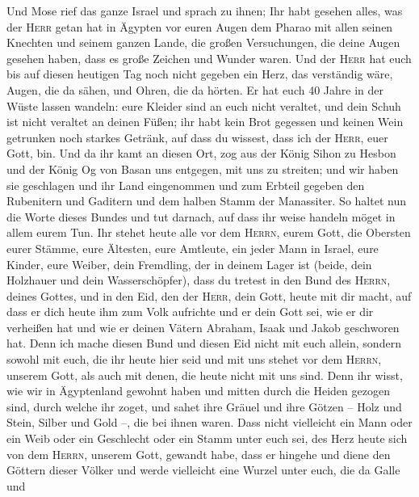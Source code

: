  Und Mose rief das ganze Israel und sprach zu ihnen; Ihr
habt gesehen alles, was der \textsc{Herr} getan hat in Ägypten vor euren
Augen dem Pharao mit allen seinen Knechten und seinem ganzen Lande,
 die großen Versuchungen, die deine Augen gesehen haben,
dass es große Zeichen und Wunder waren.  Und der
\textsc{Herr} hat euch bis auf diesen heutigen Tag noch nicht gegeben
ein Herz, das verständig wäre, Augen, die da sähen, und Ohren, die da
hörten.  Er hat euch 40 Jahre in der Wüste lassen wandeln:
eure Kleider sind an euch nicht veraltet, und dein Schuh ist nicht
veraltet an deinen Füßen;  ihr habt kein Brot gegessen und
keinen Wein getrunken noch starkes Getränk, auf dass du wissest, dass
ich der \textsc{Herr}, euer Gott, bin.  Und da ihr kamt an
diesen Ort, zog aus der König Sihon zu Hesbon und der König Og von Basan
uns entgegen, mit uns zu streiten; und wir haben sie geschlagen
 und ihr Land eingenommen und zum Erbteil gegeben den
Rubenitern und Gaditern und dem halben Stamm der Manassiter.
 So haltet nun die Worte dieses Bundes und tut darnach,
auf dass ihr weise handeln möget in allem eurem Tun.  Ihr
stehet heute alle vor dem \textsc{Herrn}, eurem Gott, die Obersten eurer
Stämme, eure Ältesten, eure Amtleute, ein jeder Mann in Israel,
 eure Kinder, eure Weiber, dein Fremdling, der in deinem
Lager ist (beide, dein Holzhauer und dein Wasserschöpfer),
 dass du tretest in den Bund des \textsc{Herrn}, deines
Gottes, und in den Eid, den der \textsc{Herr}, dein Gott, heute mit dir
macht,  auf dass er dich heute ihm zum Volk aufrichte und
er dein Gott sei, wie er dir verheißen hat und wie er deinen Vätern
Abraham, Isaak und Jakob geschworen hat.  Denn ich mache
diesen Bund und diesen Eid nicht mit euch allein, 
sondern sowohl mit euch, die ihr heute hier seid und mit uns stehet vor
dem \textsc{Herrn}, unserem Gott, als auch mit denen, die heute nicht
mit uns sind.  Denn ihr wisst, wie wir in Ägyptenland
gewohnt haben und mitten durch die Heiden gezogen sind, durch welche ihr
zoget,  und sahet ihre Gräuel und ihre Götzen -- Holz und
Stein, Silber und Gold --, die bei ihnen waren.  Dass
nicht vielleicht ein Mann oder ein Weib oder ein Geschlecht oder ein
Stamm unter euch sei, des Herz heute sich von dem \textsc{Herrn},
unserem Gott, gewandt habe, dass er hingehe und diene den Göttern dieser
Völker und werde vielleicht eine Wurzel unter euch, die da Galle und
